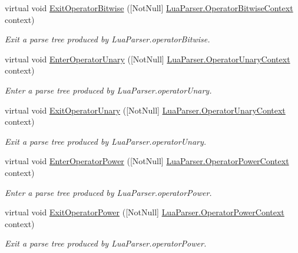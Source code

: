 \begin{DoxyCompactItemize}
virtual void \mbox{\hyperlink{classzlua_1_1_lua_base_listener_ac5e1c31e302e8eeae5a2bb9c585b40a2}{Exit\+Operator\+Bitwise}} (\mbox{[}Not\+Null\mbox{]} \mbox{\hyperlink{classzlua_1_1_lua_parser_1_1_operator_bitwise_context}{Lua\+Parser.\+Operator\+Bitwise\+Context}} context)
\begin{DoxyCompactList}\small\item\em Exit a parse tree produced by Lua\+Parser.\+operator\+Bitwise. \end{DoxyCompactList}\item 
virtual void \mbox{\hyperlink{classzlua_1_1_lua_base_listener_ac5f8a27439dcc1dbabbc0a23508f7013}{Enter\+Operator\+Unary}} (\mbox{[}Not\+Null\mbox{]} \mbox{\hyperlink{classzlua_1_1_lua_parser_1_1_operator_unary_context}{Lua\+Parser.\+Operator\+Unary\+Context}} context)
\begin{DoxyCompactList}\small\item\em Enter a parse tree produced by Lua\+Parser.\+operator\+Unary. \end{DoxyCompactList}\item 
virtual void \mbox{\hyperlink{classzlua_1_1_lua_base_listener_a7c6d18b5d844f0af74c1123b245bc373}{Exit\+Operator\+Unary}} (\mbox{[}Not\+Null\mbox{]} \mbox{\hyperlink{classzlua_1_1_lua_parser_1_1_operator_unary_context}{Lua\+Parser.\+Operator\+Unary\+Context}} context)
\begin{DoxyCompactList}\small\item\em Exit a parse tree produced by Lua\+Parser.\+operator\+Unary. \end{DoxyCompactList}\item 
virtual void \mbox{\hyperlink{classzlua_1_1_lua_base_listener_ad21692d9754c71a80f6c0378e0697f02}{Enter\+Operator\+Power}} (\mbox{[}Not\+Null\mbox{]} \mbox{\hyperlink{classzlua_1_1_lua_parser_1_1_operator_power_context}{Lua\+Parser.\+Operator\+Power\+Context}} context)
\begin{DoxyCompactList}\small\item\em Enter a parse tree produced by Lua\+Parser.\+operator\+Power. \end{DoxyCompactList}\item 
virtual void \mbox{\hyperlink{classzlua_1_1_lua_base_listener_aed60ef8f2e3a221a83c9b5be20dcc8c0}{Exit\+Operator\+Power}} (\mbox{[}Not\+Null\mbox{]} \mbox{\hyperlink{classzlua_1_1_lua_parser_1_1_operator_power_context}{Lua\+Parser.\+Operator\+Power\+Context}} context)
\begin{DoxyCompactList}\small\item\em Exit a parse tree produced by Lua\+Parser.\+operator\+Power. \end{DoxyCompactList}\item 

\end{DoxyCompactItemize}
